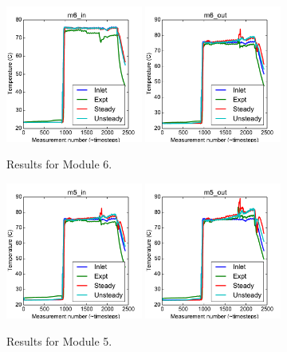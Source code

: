 \documentclass{article}
\begin{document}
\begin{figure}[!ht]
\centering
\includegraphics[width=0.4\textwidth]{../../data/ICSolar/images/Mar09_m6_in_compare.pdf}\hspace{0.05\textwidth}
\includegraphics[width=0.4\textwidth]{../../data/ICSolar/images/Mar09_m6_out_compare.pdf}\hspace{0.05\textwidth}\\
\caption{Results for Module 6.}\end{figure}
\begin{figure}[!ht]
\centering
\includegraphics[width=0.4\textwidth]{../../data/ICSolar/images/Mar09_m5_in_compare.pdf}\hspace{0.05\textwidth}
\includegraphics[width=0.4\textwidth]{../../data/ICSolar/images/Mar09_m5_out_compare.pdf}\hspace{0.05\textwidth}\\
\caption{Results for Module 5.}\end{figure}
\end{document}
